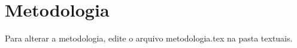 \chapter{Metodologia}
Para alterar a metodologia, edite o arquivo metodologia.tex na pasta textuais. 
